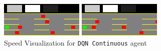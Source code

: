 \begin{figure}[H]
    \centering
    \begin{minipage}{0.48\textwidth}
        \centering
        \includegraphics[width=\linewidth]{plots/part2.2-speed_visualization_00_step_0140.png}
    \end{minipage}
    \hfill
    \begin{minipage}{0.48\textwidth}
        \centering
        \includegraphics[width=\linewidth]{plots/part2.2-speed_visualization_01_step_0880.png}
    \end{minipage}
    \caption{Speed Visualization for    
    \texttt{DQN Continuous} agent}
    \label{fig:part2.2-speed-visualization}
\end{figure}


